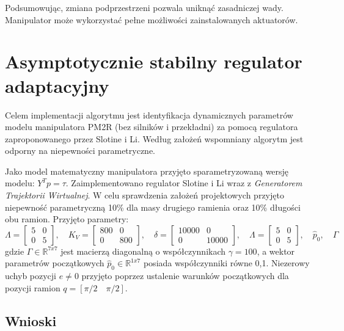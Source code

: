 \documentclass[12pt, a4paper, polish]{article}
\begin{document}
Podsumowując, zmiana podprzestrzeni pozwala uniknąć zasadniczej wady. Manipulator może wykorzystać pełne możliwości zainstalowanych aktuatorów.

\section{Asymptotycznie stabilny regulator adaptacyjny}
Celem implementacji algorytmu jest identyfikacja dynamicznych parametrów modelu manipulatora PM2R (bez silników i przekładni) za pomocą regulatora zaproponowanego przez Slotine i Li. Według założeń wspomniany algorytm jest odporny na niepewności parametryczne.

Jako model matematyczny manipulatora przyjęto sparametryzowaną wersję modelu: $Y^Tp=\tau$. Zaimplementowano regulator Slotine i Li wraz z \textit{Generatorem Trajektorii Wirtualnej}. W celu sprawdzenia założeń projektowych przyjęto niepewność parametryczną 10\% dla masy drugiego ramienia oraz 10\% długości obu ramion. Przyjęto parametry:\begin{equation}
\Lambda=\begin{bmatrix}5 & 0 \\ 0 & 5\end{bmatrix},\quad K_V=\begin{bmatrix}800 & 0 \\ 0 & 800\end{bmatrix}, \quad \delta=\begin{bmatrix}10000 & 0 \\ 0 & 10000\end{bmatrix},\quad \Lambda=\begin{bmatrix}5 & 0 \\ 0 & 5\end{bmatrix},\quad \hat{p}_0,\quad\Gamma\end{equation}
gdzie $\Gamma \in \mathbb{R}^{7x7}$ jest macierzą diagonalną o współczynnikach $\gamma=100$, a wektor parametrów początkowych $\hat{p}_0\in\mathbb{R}^{1x7}$ posiada współczynniki równe 0,1. Niezerowy uchyb pozycji $e\neq0$ przyjęto poprzez ustalenie warunków początkowych dla pozycji ramion $q=[\pi/2\quad \pi/2]$. 

\subsection{Wnioski}
\end{document}
